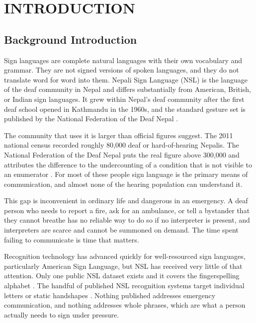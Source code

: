 \chapter{INTRODUCTION}

\section{Background Introduction}

Sign languages are complete natural languages with their own vocabulary and grammar. They are not signed versions of spoken languages, and they do not translate word for word into them. Nepali Sign Language (NSL) is the language of the deaf community in Nepal and differs substantially from American, British, or Indian sign languages. It grew within Nepal's deaf community after the first deaf school opened in Kathmandu in the 1960s, and the standard gesture set is published by the National Federation of the Deaf Nepal \cite{acharya2003nsldict, sunuwar2024nsl23}.

\noindent The community that uses it is larger than official figures suggest. The 2011 national census recorded roughly 80{,}000 deaf or hard-of-hearing Nepalis. The National Federation of the Deaf Nepal puts the real figure above 300{,}000 and attributes the difference to the undercounting of a condition that is not visible to an enumerator \cite{nepalitimes2022, hi2023}. For most of these people sign language is the primary means of communication, and almost none of the hearing population can understand it.

\noindent This gap is inconvenient in ordinary life and dangerous in an emergency. A deaf person who needs to report a fire, ask for an ambulance, or tell a bystander that they cannot breathe has no reliable way to do so if no interpreter is present, and interpreters are scarce and cannot be summoned on demand. The time spent failing to communicate is time that matters.

\noindent Recognition technology has advanced quickly for well-resourced sign languages, particularly American Sign Language, but NSL has received very little of that attention. Only one public NSL dataset exists and it covers the fingerspelling alphabet \cite{sunuwar2024nsl23}. The handful of published NSL recognition systems target individual letters or static handshapes \cite{mali2018nsl, shrestha2024nsl, poudel2025nsl}. Nothing published addresses emergency communication, and nothing addresses whole phrases, which are what a person actually needs to sign under pressure.

